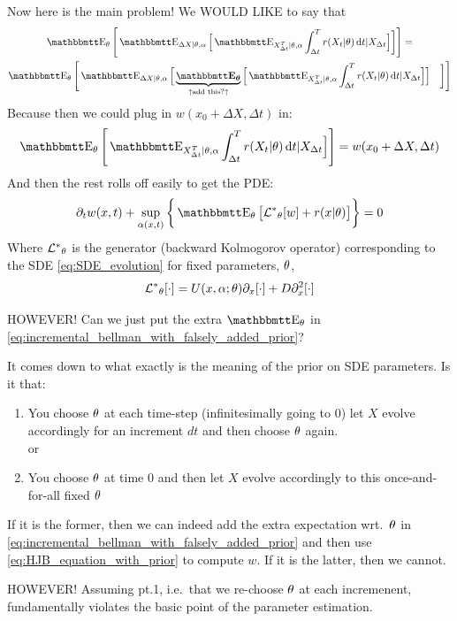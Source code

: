 \documentclass{article}
\begin{document}
Now here is the main problem! We WOULD LIKE to say that
\begin{multline}
\Exp_\th \Bigg[ \Exp_{\Delta X |\th, \a} \Big[ \Exp_{X_{\dt}^T|\th, \a}
\int_\dt^T r(X_t| \th) \intd{t} | X_\dt \Big] \bigg] \Bigg] 
= \\
\Exp_\th \Bigg[ \Exp_{\Delta X |\th, \a} \Big[ 
\underbrace{\boldsymbol{\Exp_\th}}_{\uparrow\textrm{add this?} \uparrow} \Big[
\Exp_{X_{\dt}^T|\th, \a} \int_\dt^T r(X_t| \th) \intd{t} | X_\dt \Big]\Big]
\quad \bigg] \Bigg]
\label{eq:incremental_bellman_with_falsely_added_prior}
\end{multline}
Because then we could plug in $w(x_0 + \Delta X, \Delta t)$ in:
$$
\Exp_\th \Bigg[
\Exp_{X_{\dt}^T|\th, \a} \int_\dt^T r(X_t| \th) \intd{t} | X_\dt \Big]\Bigg] =
 w(x_0
+ \Delta X, \Delta t) $$
And then the rest rolls off easily to get the PDE:
\begin{equation}
\di_t w(x,t) + \sup_{\a(x,t)} \bigg\{  \Exp_\th \big[\Lstar_\th [w] +
r(x|\th)\big] \bigg\} = 0
\label{eq:HJB_equation_with_prior}
\end{equation}
Where ${ { \mathcal{L} }^* }_{\theta}$ is the generator (backward Kolmogorov operator) corresponding
to the SDE \cref{eq:SDE_evolution} for fixed parameters, ${\theta}$,
$$
{ { \mathcal{L} }^* }_{\theta}[\cdot] = U(x,{\alpha}; {\theta}) {\partial}_x[\cdot] + D {\partial}_x^2[\cdot]
$$

HOWEVER! Can we just put the extra
$\Exp_\th$ in \cref{eq:incremental_bellman_with_falsely_added_prior}? 

It comes down to what exactly is the meaning of the prior on
SDE parameters. Is it that:
\begin{enumerate}
  \item You choose ${\theta}$ at each time-step (infinitesimally going to 0) let $X$
  evolve accordingly for an increment $dt$ and then choose ${\theta}$ again.
  \\
  or
  \item You choose ${\theta}$ at time $0$ and then let $X$ evolve accordingly to this
  once-and-for-all fixed ${\theta}$
\end{enumerate}

If it is the former, then we can indeed add the extra expectation wrt.\ ${\theta}$
in \cref{eq:incremental_bellman_with_falsely_added_prior} and then use
\cref{eq:HJB_equation_with_prior} to compute $w$. If it is the latter, then we
cannot.

HOWEVER! Assuming pt.1, i.e.\ that we re-choose ${\theta}$ at each incremenent,
fundamentally violates the basic point of the parameter estimation.
\end{document}
